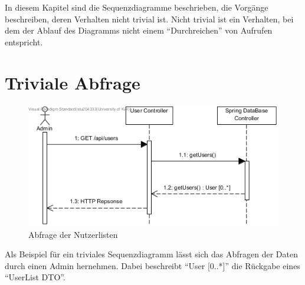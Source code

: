 
In diesem Kapitel sind die Sequenzdiagramme beschrieben, die Vorgänge beschreiben, deren Verhalten nicht trivial ist.
Nicht trivial ist ein Verhalten, bei dem der Ablauf des Diagramms nicht einem ``Durchreichen'' von Aufrufen entspricht.
\section{Triviale Abfrage}
\begin{figure}[H]
	\centering
	\includegraphics[width = 12cm]{img/diagrams/TrivialDiagram}
	\caption{Abfrage der Nutzerlisten}
\end{figure}
Als Beispiel für ein triviales Sequenzdiagramm lässt sich das Abfragen der Daten durch einen Admin hernehmen. Dabei beschreibt ``User [0..*]'' die Rückgabe eines ``UserList DTO''.
 
